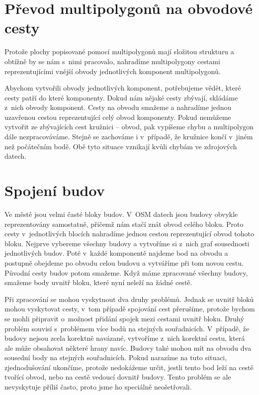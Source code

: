 \section{Převod multipolygonů na obvodové cesty}
Protože plochy popisované pomocí multipolygonů mají složitou strukturu a obtížně
by se nám s~nimi pracovalo, nahradíme multipolygony cestami reprezentujícími
vnější obvody jednotlivých komponent multipolygonů.

Abychom vytvořili obvody jednotlivých komponent, potřebujeme vědět, které cesty
patří do které komponenty.  Dokud nám nějaké cesty zbývají, skládáme z~nich
obvody komponent. Cesty na obvodu smažeme a nahradíme jednou uzavřenou cestou
reprezentující celý obvod komponenty. Pokud nemůžeme vytvořit ze zbývajících
cest kružnici -- obvod, pak vypíšeme chybu a multipolygon dále nezpracováváme.
Stejně se zachováme i v~případě, že kružnice končí v~jiném než počátečním bodě.
Obě tyto situace vznikají kvůli chybám ve zdrojových datech.

\section{Spojení budov}
Ve městě jsou velmi časté bloky budov. V~OSM datech jsou budovy obvykle reprezentovány
samostatně, přičemž nám stačí znát obvod celého bloku. Proto cesty
v~jednotlivých blocích nahradíme jednou cestou reprezentující obvod tohoto bloku.
Nejprve vybereme všechny budovy a vytvoříme si z~nich graf sousednosti
jednotlivých budov. Poté v~každé komponentě najdeme bod na obvodu a postupně
obejdeme po obvodu celou budovu a vytváříme při tom novou cestu. Původní
cesty budov potom smažeme. Když máme zpracované všechny budovy, smažeme body uvnitř
bloku, které nyní neleží na žádné cestě.

Při zpracování se mohou vyskytnout dva druhy problémů. Jednak se uvnitř bloků
mohou vyskytovat cesty, v~tom případě spojování cest přerušíme, protože bychom
se mohli připravit o~možnost přidání spojek mezi cestami uvnitř bloku. Druhý
problém souvisí s~problémem více bodů na stejných souřadnicích. V~případě, že
budovy nejsou zcela korektně navázané, vytvoříme z~nich korektní cestu, která
ale může obsahovat některé hrany navíc. Budovy také mohou mít na obvodu dva sousední body
na stejných souřadnicích. Pokud narazíme na tuto situaci, zjednodušování
ukončíme, protože nedokážeme určit, jestli tento bod leží na cestě tvořící
obvod, nebo na cestě vedoucí dovnitř budovy. Tento problém se ale nevyskytuje
příliš často, proto jsme ho speciálně neošetřovali.

